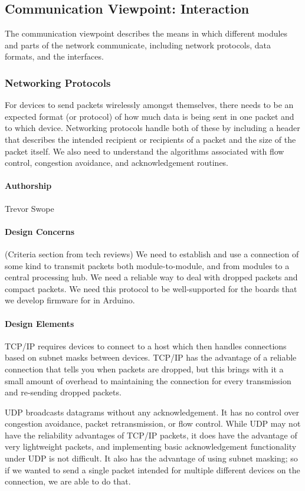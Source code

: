 \documentclass[onecolumn, draftclsnofoot,10pt, compsoc]{IEEEtran}
\begin{document}
\subsection{Communication Viewpoint: Interaction}
    The communication viewpoint describes the means in which different modules and parts of the network communicate, including network protocols, data formats, and the interfaces.

\subsubsection{Networking Protocols}
    For devices to send packets wirelessly amongst themselves, there needs to be an expected format (or protocol) of how much data is being sent in one packet and to which device. Networking protocols handle both of these by including a header that describes the intended recipient or recipients of a packet and the size of the packet itself. We also need to understand the algorithms associated with flow control, congestion avoidance, and acknowledgement routines.

\paragraph{Authorship}
    Trevor Swope

\paragraph{Design Concerns} (Criteria section from tech reviews)
    We need to establish and use a connection of some kind to transmit packets both module-to-module, and from modules to a central processing hub. We need a reliable way to deal with dropped packets and compact packets. We need this protocol to be well-supported for the boards that we develop firmware for in Arduino.

\paragraph{Design Elements}
    TCP/IP \cite{TCP} requires devices to connect to a host which then handles connections based on subnet masks between devices. TCP/IP has the advantage of a reliable connection that tells you when packets are dropped, but this brings with it a small amount of overhead to maintaining the connection for every transmission and re-sending dropped packets.

    UDP \cite{UDP} broadcasts datagrams without any acknowledgement. It has no control over congestion avoidance, packet retransmission, or flow control. While UDP may not have the reliability advantages of TCP/IP packets, it does have the advantage of very lightweight packets, and implementing basic acknowledgement functionality under UDP is not difficult. It also has the advantage of using subnet masking; so if we wanted to send a single packet intended for multiple different devices on the connection, we are able to do that.
\end{document}
